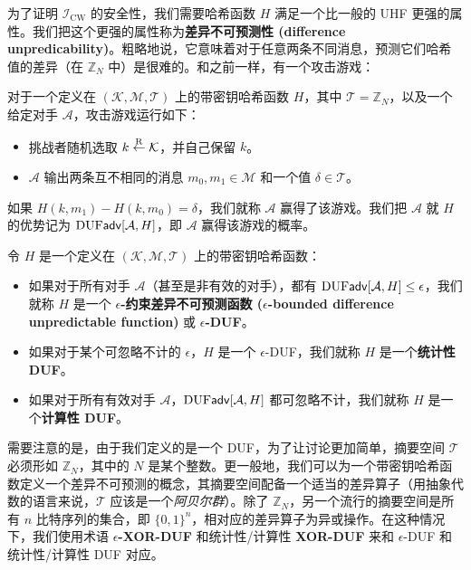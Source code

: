 \begin{snote}
为了证明 $\mathcal{I}_\mathrm{CW}$ 的安全性，我们需要哈希函数 $H$ 满足一个比一般的 UHF 更强的属性。我们把这个更强的属性称为\textbf{差异不可预测性 (difference unpredicability)}。粗略地说，它意味着对于任意两条不同消息，预测它们哈希值的差异（在 $\mathbb{Z}_N$ 中）是很难的。和之前一样，有一个攻击游戏：
\end{snote}

\begin{game}[差异不可预测性]\label{game:7-3}
对于一个定义在 $(\mathcal{K},\mathcal{M},\mathcal{T})$ 上的带密钥哈希函数 $H$，其中 $\mathcal{T}=\mathbb{Z}_N$，以及一个给定对手 $\mathcal{A}$，攻击游戏运行如下：
\begin{itemize}
	\item 挑战者随机选取 $k\overset{\rm R}\leftarrow\mathcal{K}$，并自己保留 $k$。
	\item $\mathcal{A}$ 输出两条互不相同的消息 $m_0,m_1\in\mathcal{M}$ 和一个值 $\delta\in\mathcal{T}$。
\end{itemize}
如果 $H(k,m_1)-H(k,m_0)=\delta$，我们就称 $\mathcal{A}$ 赢得了该游戏。我们把 $\mathcal{A}$ 就 $H$ 的优势记为 ${\rm DUF}\mathsf{adv}[\mathcal{A},H]$，即 $\mathcal{A}$ 赢得该游戏的概率。
\end{game}

\begin{definition}\label{def:7-5}
令 $H$ 是一个定义在 $(\mathcal{K},\mathcal{M},\mathcal{T})$ 上的带密钥哈希函数：
\begin{itemize}
	\item 如果对于所有对手 $\mathcal{A}$（甚至是非有效的对手），都有 ${\rm DUF}\mathsf{adv}[\mathcal{A},H]\leq\epsilon$，我们就称 $H$ 是一个 \textbf{$\epsilon$-约束差异不可预测函数 ($\epsilon$-bounded difference unpredictable function)} 或 \textbf{$\epsilon$-DUF}。
	\item 如果对于某个可忽略不计的 $\epsilon$，$H$ 是一个 $\epsilon$-DUF，我们就称 $H$ 是一个\textbf{统计性 DUF}。
	\item 如果对于所有有效对手 $\mathcal{A}$，${\rm DUF}\mathsf{adv}[\mathcal{A},H]$ 都可忽略不计，我们就称 $H$ 是一个\textbf{计算性 DUF}。
\end{itemize}
\end{definition}

\begin{remark}\label{remark:7-3}
需要注意的是，由于我们定义的是一个 DUF，为了让讨论更加简单，摘要空间 $\mathcal{T}$ 必须形如 $\mathbb{Z}_N$，其中的 $N$ 是某个整数。更一般地，我们可以为一个带密钥哈希函数定义一个差异不可预测的概念，其摘要空间配备一个适当的差异算子（用抽象代数的语言来说，$\mathcal{T}$ 应该是一个\emph{阿贝尔群}）。除了 $\mathbb{Z}_N$，另一个流行的摘要空间是所有 $n$ 比特序列的集合，即 $\{0,1\}^n$，相对应的差异算子为异或操作。在这种情况下，我们使用术语 \textbf{$\epsilon$-XOR-DUF} 和统计性/计算性 \textbf{XOR-DUF} 来和 $\epsilon$-DUF 和统计性/计算性 DUF 对应。
\end{remark}

